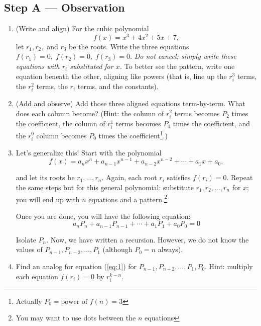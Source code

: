 \documentclass{tufte-handout}
\begin{document}
\subsection*{Step A — Observation}
\begin{enumerate}[label=\textbf{A\arabic*.}, leftmargin=*, itemsep=3em]
  \item (Write and align) For the cubic polynomial
  \[
    f(x)=x^3+4x^2+5x+7,
  \]
  let $r_1, r_2,$ and $r_3$ be the roots. Write the three equations $f(r_1)=0,\; f(r_2)=0,\; f(r_3)=0$. \textit{Do not cancel; simply write these equations with $r_i$ substituted for $x$.} To better see the pattern, write one equation beneath the other, aligning like powers (that is, line up the $r_i^3$ terms, the $r_i^2$ terms, the $r_i$ terms, and the constants). 
  \item (Add and observe) Add those three aligned equations term-by-term. What does each column become? (Hint: the column of $r_i^2$ terms becomes $P_2$ times the coefficient, the column of $r_i^1$ terms becomes $P_1$ times the coefficient, and the $r_i^0$ column becomes $P_0$ times the coefficient\footnote{Actually $P_0=\text{power of } f(n)=3$}.)
  \item Let's generalize this! Start with the polynomial
\[
f(x)=a_nx^n + a_{n-1} x^{n-1} + a_{n-2} x^{n-2} + \cdots + a_1 x + a_0,
\]

and let its roots be $r_1,\dots,r_n$. Again, each root $r_i$ satisfies $f(r_i)=0$. Repeat the same steps but for this general polynomial: substitute $r_1,r_2,\dots,r_n$ for $x$; you will end up with $n$ equations and a pattern.\footnote{You may want to use dots between the $n$ equations}

\vspace{18em}
Once you are done, you will have the following equation:
\begin{equation}\label{eq:1}
a_nP_n+a_{n-1}P_{n-1}+\cdots+a_1P_1+a_0P_0=0
\end{equation}

Isolate $P_n$. Now, we have written a recursion. However, we do not know the values of $P_{n-1}, P_{n-2},\dots,P_1$ (although $P_0=n$ always). 

\item Find an analog for equation (\ref{eq:1}) for $P_{n-1}, P_{n-2},\dots,P_1,P_0$. Hint: multiply each equation $f(r_i)=0$ by $r_i^{k-n}$.
\vspace{18em}

\end{enumerate}
\end{document}
